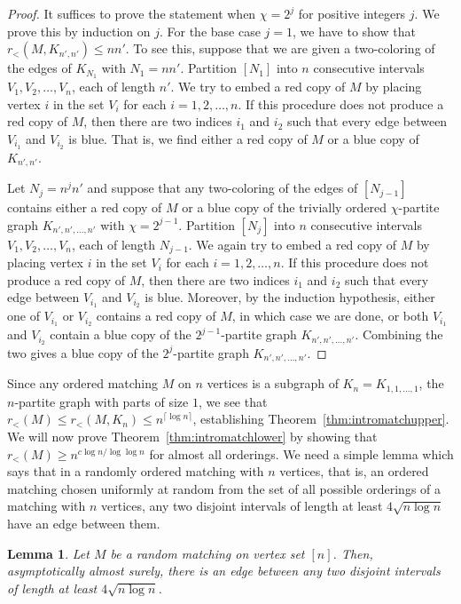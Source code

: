 \documentclass[11pt]{article}
\newtheorem{lemma}[theorem]{Lemma}
\newcommand{\rord}{r_{<}}
\begin{document}
\begin{proof}
It suffices to prove the statement when $\chi = 2^j$ for positive integers $j$. We prove this by induction on $j$. For the base case $j = 1$, we have to show that $r_<(M, K_{n',n'}) \leq n n'$. To see this, suppose that we are given a two-coloring of the edges of $K_{N_1}$ with $N_1 = nn'$.  Partition $[N_1]$ into $n$ consecutive intervals $V_{1}, V_2, \dots, V_{n}$, each of length $n'$. We try to embed a red copy of $M$ by placing vertex $i$ in the set $V_i$ for each $i = 1, 2, \dots, n$. If this procedure does not produce a red copy of $M$, then there are two indices $i_1$ and $i_2$ such that every edge between $V_{i_1}$ and $V_{i_2}$ is blue. That is, we find either a red copy of $M$ or a blue copy of $K_{n',n'}$.

Let $N_j = n^j n'$ and suppose that any two-coloring of the edges of $[N_{j-1}]$ contains either a red copy of $M$ or a blue copy of the trivially ordered $\chi$-partite graph $K_{n', n', \dots, n'}$ with $\chi = 2^{j-1}$. Partition $[N_{j}]$ into $n$ consecutive intervals $V_{1}, V_2, \dots, V_{n}$, each of length $N_{j-1}$.  We again try to embed a red copy of $M$ by placing vertex $i$ in the set $V_i$ for each $i = 1, 2, \dots, n$. If this procedure does not produce a red copy of $M$, then there are two indices
$i_1$ and $i_2$ such that every edge between $V_{i_1}$ and $V_{i_2}$ is blue. Moreover, by the induction hypothesis, either one of $V_{i_1}$ or $V_{i_2}$ contains a red copy of $M$, in which case we are done, or both $V_{i_1}$ and $V_{i_2}$ contain a blue copy of the $2^{j-1}$-partite graph $K_{n',n', \dots, n'}$. Combining the two gives a blue copy of the $2^j$-partite graph $K_{n',n',\dots,n'}$.
\end{proof}

Since any ordered matching $M$ on $n$ vertices is a subgraph of $K_n = K_{1,1, \dots, 1}$, the $n$-partite graph with parts of size $1$, we see that $r_<(M) \leq r_<(M, K_n) \leq n^{\lceil \log n \rceil}$, establishing Theorem~\ref{thm:intromatchupper}. We will now prove Theorem~\ref{thm:intromatchlower} by showing that $\rord(M) \geq n^{c \log n/\log \log n}$ for almost all orderings. We need a simple lemma which says that in a randomly ordered matching with $n$ vertices, that is, an ordered matching chosen uniformly at random from the set of all possible orderings of a matching with $n$ vertices, any two disjoint intervals of length at least $4\sqrt{n \log n}$ have an edge between them.

\begin{lemma} \label{lem:jumbprop}
Let $M$ be a random matching on vertex set $[n]$. Then, asymptotically almost surely, there is an edge between any two disjoint intervals of length at least $4 \sqrt{n \log n}$.
\end{lemma}
\end{document}
